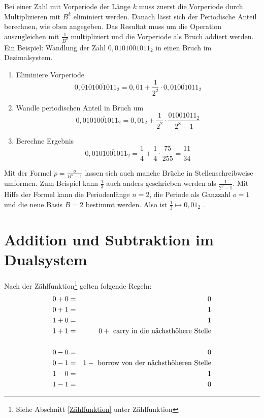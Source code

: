 \documentclass[11pt,a4paper]{scrreprt}
\begin{document}
Bei einer Zahl mit Vorperiode der Länge $k$ muss zuerst die Vorperiode durch Multiplizieren mit $B^k$ eliminiert werden. Danach lässt sich der Periodische Anteil berechnen, wie oben angegeben. Das Resultat muss um die Operation auszugleichen mit $\frac{1}{B^k}$ multipliziert und die Vorperiode als Bruch addiert werden. Ein Beispiel: Wandlung der Zahl $0,01\overline{01001011}_2$ in einen Bruch im Dezimalsystem.
\begin{enumerate}
\item
	Eliminiere Vorperiode
	$$ 0,01\overline{01001011}_2 = 0,01 
		+ \frac{1}{2^2} \cdot 0,\overline{01001011}_2$$

\item
	Wandle periodischen Anteil in Bruch um
	$$ 0,01\overline{01001011}_2 = 0,01_2 
		+ \frac{1}{2^2} \cdot \frac{01001011_2}{2^8 - 1}$$
		
\item
	Berechne Ergebnis
	$$ 0,01\overline{01001011}_2 = \frac{1}{4} 
		+ \frac{1}{4} \cdot \frac{75}{255} = \frac{11}{34}$$
\end{enumerate}

Mit der Formel $p = \frac{o}{B^n - 1}$ lassen sich auch manche Brüche in Stellenschreibweise umformen. Zum Beispiel kann $\frac{1}{3}$ auch anders geschrieben werden als $\frac{1}{2^2 - 1}$. Mit Hilfe der Formel kann die Periodenlänge $n = 2$, die Periode als Ganzzahl $o = 1$ und die neue Basis $B = 2$ bestimmt werden. Also ist $\frac{1}{3} \mapsto 0,\overline{01}_2$ .

\section{Addition und Subtraktion im Dualsystem}
Nach der Zählfunktion\footnote{Siehe Abschnitt \ref{Zählfunktion} unter Zählfunktion} gelten folgende Regeln:
\begin{eqnarray*}
	0 + 0 & = & 0 \\
	0 + 1 & = & 1 \\
	1 + 0 & = & 1 \\
	1 + 1 & = & 0 +\textnormal{ carry in die nächsthöhere Stelle}\\ 
	\\
	0 - 0 & = & 0 \\
	0 - 1 & = & 1 -\textnormal{ borrow von der nächsthöheren Stelle}\\
	1 - 0 & = & 1 \\
	1 - 1 & = & 0 \\ 
\end{eqnarray*}
\end{document}

